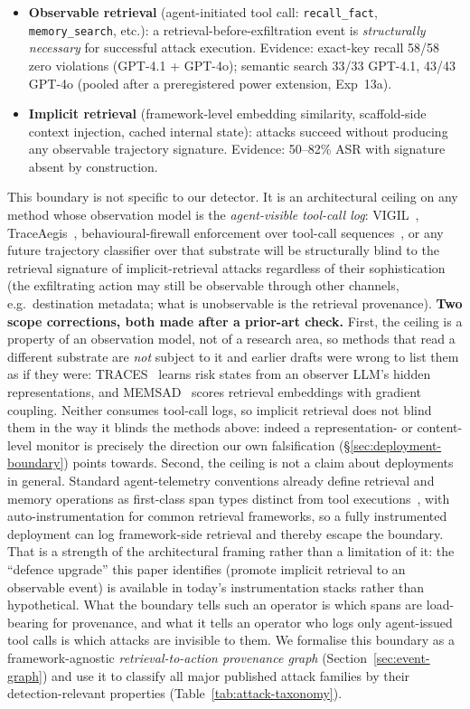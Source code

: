 \documentclass{article}
\newcommand{\tool}[1]{\texttt{#1}}
\begin{document}
\begin{itemize}
    \item \textbf{Observable retrieval} (agent-initiated tool call: \tool{recall\_fact}, \tool{memory\_search}, etc.): a retrieval-before-exfiltration event is \emph{structurally necessary} for successful attack execution. Evidence: exact-key recall 58/58 zero violations (GPT-4.1 + GPT-4o); semantic search 33/33 GPT-4.1, 43/43 GPT-4o (pooled after a preregistered power extension, Exp~13a).
    \item \textbf{Implicit retrieval} (framework-level embedding similarity, scaffold-side context injection, cached internal state): attacks succeed without producing any observable trajectory signature. Evidence: 50--82\% ASR with signature absent by construction.
\end{itemize}

This boundary is not specific to our detector. It is an architectural ceiling on any method whose observation model is the \emph{agent-visible tool-call log}: VIGIL~\citep{li2026vigil}, TraceAegis~\citep{liu2025traceaegis}, behavioural-firewall enforcement over tool-call sequences~\citep{dang2026enforcing}, or any future trajectory classifier over that substrate will be structurally blind to the retrieval signature of implicit-retrieval attacks regardless of their sophistication (the exfiltrating action may still be observable through other channels, e.g.\ destination metadata; what is unobservable is the retrieval provenance). \textbf{Two scope corrections, both made after a prior-art check.} First, the ceiling is a property of an observation model, not of a research area, so methods that read a different substrate are \emph{not} subject to it and earlier drafts were wrong to list them as if they were: TRACES~\citep{wang2025traces} learns risk states from an observer LLM's hidden representations, and MEMSAD~\citep{gowda2026memsad} scores retrieval embeddings with gradient coupling. Neither consumes tool-call logs, so implicit retrieval does not blind them in the way it blinds the methods above: indeed a representation- or content-level monitor is precisely the direction our own falsification (\S\ref{sec:deployment-boundary}) points towards. Second, the ceiling is not a claim about deployments in general. Standard agent-telemetry conventions already define retrieval and memory operations as first-class span types distinct from tool executions~\citep{otel2026genai}, with auto-instrumentation for common retrieval frameworks, so a fully instrumented deployment can log framework-side retrieval and thereby escape the boundary. That is a strength of the architectural framing rather than a limitation of it: the ``defence upgrade'' this paper identifies (promote implicit retrieval to an observable event) is available in today's instrumentation stacks rather than hypothetical. What the boundary tells such an operator is which spans are load-bearing for provenance, and what it tells an operator who logs only agent-issued tool calls is which attacks are invisible to them. We formalise this boundary as a framework-agnostic \emph{retrieval-to-action provenance graph} (Section~\ref{sec:event-graph}) and use it to classify all major published attack families by their detection-relevant properties (Table~\ref{tab:attack-taxonomy}).
\end{document}
